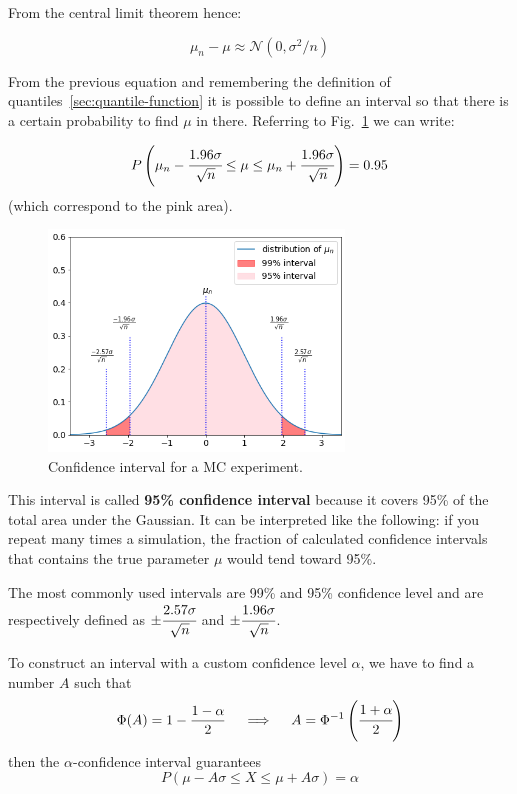 From the central limit theorem hence: 

\begin{equation}
\mu_n - \mu \approx \mathcal{N}(0, \sigma^2/n)
\end{equation}

From the previous equation and remembering the definition of quantiles~\ref{sec:quantile-function} it is possible to define an interval so that there is a certain probability to find $\mu$ in there. Referring to Fig.~\ref{fig:confidence_interval} we can write:

\begin{equation}
P\left(\mu_n - \cfrac{1.96\sigma}{\sqrt{n}}\le \mu \le \mu_n + \cfrac{1.96\sigma}{\sqrt{n}}\right) = 0.95
\end{equation}
(which correspond to the pink area).

\begin{figure}[htb]
\centering
\includegraphics[width=0.7\textwidth]{figures/confidence_interval}
\caption{Confidence interval for a MC experiment.}
\label{fig:confidence_interval}
\end{figure}

This interval is called \textbf{95\% confidence interval} because it covers 95\% of the total area under the Gaussian. It can be interpreted like the following: if you repeat many times a simulation, the fraction of calculated confidence intervals that contains the true parameter $\mu$ would tend toward 95\%.

The most commonly used intervals are 99\% and 95\% confidence level and are respectively defined as \(\pm \cfrac{2.57\sigma}{\sqrt{n}}\) and \(\pm \cfrac{1.96\sigma}{\sqrt{n}}\).

To construct an interval with a custom confidence level $\alpha$, we have to find a number $A$ such that
\begin{equation}
\Phi(A) = 1 - \frac{1-\alpha}{2}\quad\implies\quad A = \Phi^{-1}\left(\cfrac{1+\alpha}{2}\right)
\label{for:A}
\end{equation}
then the $\alpha$-confidence interval guarantees
\begin{equation}
P(\mu - A\sigma \le X \le \mu+ A\sigma) = \alpha 
\end{equation}

